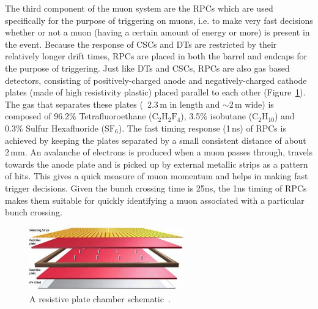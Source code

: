 The third component of the muon system are the RPCs which are used specifically for the purpose of triggering on muons, i.e. to make very fast decisions whether or not a muon (having a certain amount of energy or more) is present in the event. Because the response of CSCs and DTs are restricted by their relatively longer drift times, RPCs are placed in both the barrel and endcaps for the purpose of triggering. Just like DTs and CSCs, RPCs are also gas based detectors, consisting of positively-charged anode and negatively-charged cathode plates (made of high resistivity plastic) placed parallel to each other (Figure~\ref{fig:rpc}). The gas that separates these plates (~2.3\,m in length and $\sim$2\,m wide) is composed of 96.2\% Tetrafluoroethane ($\mathrm{C}_{2}\mathrm{H}_{2}\mathrm{F}_{4}$), 3.5\% isobutane ($\mathrm{C}_{2}\mathrm{H}_{10}$) and 0.3\% Sulfur Hexafluoride ($\mathrm{S}\mathrm{F}_{6}$). The fast timing response (1\,ns) of RPCs is achieved by keeping the plates separated by a small consistent distance of about 2\,mm. An avalanche of electrons is produced  when a muon passes through, travels towards the anode plate and is picked up by external metallic strips as a pattern of hits. This gives a quick measure of muon momentum and helps in making fast trigger decisions. Given the bunch crossing time is 25ns, the 1ns timing of RPCs makes them suitable for quickly identifying a muon associated with a particular bunch crossing.      

\begin{figure}
  \begin{center}
    \captionsetup{justification=centering}
  \includegraphics[width=0.6\textwidth,keepaspectratio]{plots_and_figures/chapter3/RPC.jpg}
\caption{A resistive plate chamber schematic~\cite{muon2}.}
\label{fig:rpc}
\end{center}
\end{figure}

